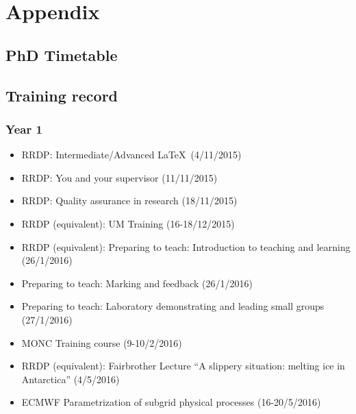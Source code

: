 \documentclass[11pt,a4paper]{article}
\begin{document}
\newpage
\section*{Appendix}

\renewcommand\thefigure{A.\arabic{figure}}
\setcounter{figure}{0}    
\subsection*{PhD Timetable}

\begin{figure}[htp!]
    
\end{figure}

%

\subsection*{Training record}
\subsubsection*{Year 1}

\begin{itemize}
  \item RRDP: Intermediate/Advanced \LaTeX\ (4/11/2015)
  \item RRDP: You and your supervisor (11/11/2015)
  \item RRDP: Quality assurance in research (18/11/2015)
  \item RRDP (equivalent): UM Training (16-18/12/2015)
  \item RRDP (equivalent): Preparing to teach: Introduction to teaching and learning (26/1/2016)
  \item Preparing to teach: Marking and feedback (26/1/2016)
  \item Preparing to teach: Laboratory demonstrating and leading small groups (27/1/2016)
  \item MONC Training course (9-10/2/2016)
  \item RRDP (equivalent): Fairbrother Lecture ``A slippery situation: melting ice in Antarctica'' (4/5/2016)
  \item ECMWF Parametrization of subgrid physical processes (16-20/5/2016)
\end{itemize}
\end{document}
